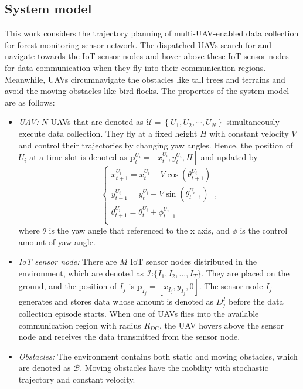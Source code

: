 \documentclass[journal]{IEEEtran}
\begin{document}
\subsection{System model}
This work considers the trajectory planning of multi-UAV-enabled data collection for forest monitoring sensor network. The dispatched UAVs search for and navigate towards the IoT sensor nodes and hover above these IoT sensor nodes for data communication when they fly into their communication regions. Meanwhile, UAVs circumnavigate the obstacles like tall trees and terrains and avoid the moving obstacles like bird flocks. The properties of the system model are as follows: 
\begin{itemize}
  \item \textit{UAV:} $N$ UAVs that are denoted as $\mathcal{U}=\left\{U_1, U_2, \cdots, U_N\right\}$ simultaneously execute data collection. They fly at a fixed height $H$ with constant velocity $V$ and control their trajectories by changing yaw angles. Hence, the position of $U_i$ at a time slot is denoted as $\boldsymbol{p}^{U_i}_{t}=[x^{U_i}_{t},y^{U_i}_{t},H]$ and updated by
    \begin{equation}\label{eq_dynamic}
    \left\{ \begin{array}{ll}
    x^{U_i}_{t+1}=x^{U_i}_{t}+V\cos(\theta^{U_i}_{t+1}) \\
    y^{U_i}_{t+1}=y^{U_i}_{t}+V\sin(\theta^{U_i}_{t+1}) \\
    \theta^{U_i}_{t+1}=\theta^{U_i}_{t}+\phi^{U_i}_{t+1} \\
    \end{array} \right. ,
    \end{equation}
     where $\theta$ is the yaw angle that referenced to the x axis, and $\phi$ is the control amount of yaw angle.
  \item \textit{IoT sensor node:} There are $M$ IoT sensor nodes distributed in the environment, which are denoted as $\mathcal{I}$:$\{I_{1}, I_{2}, ... , I_{T}\}$. They are placed on the ground, and the position of $I_{j}$ is $\boldsymbol{p}_{I_{j}}=[x_{I_{j}}, y_{I_{j}}, 0]$. The sensor node $I_{j}$ generates and stores data whose amount is denoted as $D^I_j$ before the data collection episode starts. 
      When one of UAVs flies into the available communication region with radius $R_{DC}$, the UAV hovers above the sensor node and receives the data transmitted from the sensor node. 
  \item \textit{Obstacles:} The environment contains both static and moving obstacles, which are denoted as $\mathcal{B}$. Moving obstacles have the mobility with stochastic trajectory and constant velocity. 
\end{itemize}
\end{document}
